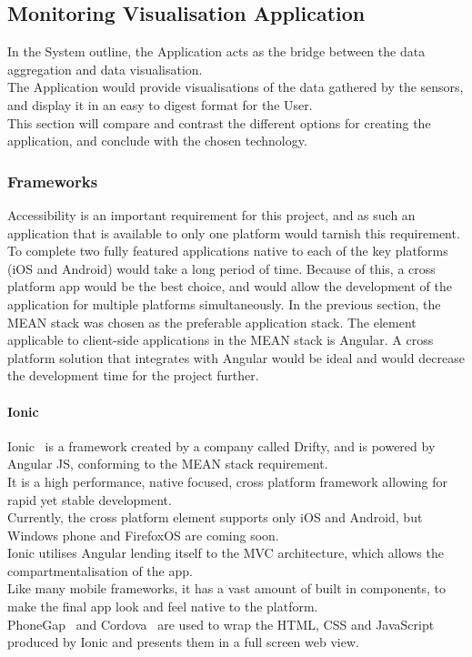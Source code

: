\documentclass[draft,preprint,12pt,3p]{elsarticle}
\begin{document}
\clearpage
\subsection{Monitoring Visualisation Application}
In the System outline, the Application acts as the bridge between the data aggregation and data visualisation.\\
The Application would provide visualisations of the data gathered by the sensors, and display it in an easy to digest format for the User.\\
This section will compare and contrast the different options for creating the application, and conclude with the chosen technology.

\subsubsection{Frameworks}
Accessibility is an important requirement for this project, and as such an application that is available to only one platform would tarnish this requirement.\\
To complete two fully featured applications native to each of the key platforms (iOS and Android) would take a long period of time. Because of this, a cross platform app would be the best choice, and would allow the development of the application for multiple platforms simultaneously.
In the previous section, the MEAN stack was chosen as the preferable application stack. The element applicable to client-side applications in the MEAN stack is Angular. A cross platform solution that integrates with Angular would be ideal and would decrease the development time for the project further.

\paragraph{Ionic}
Ionic~\cite{ionic} is a framework created by a company called Drifty, and is powered by Angular JS, conforming to the MEAN stack requirement.\\
It is a high performance, native focused, cross platform framework allowing for rapid yet stable development.\\
Currently, the cross platform element supports only iOS and Android, but Windows phone and FirefoxOS are coming soon.\\
Ionic utilises Angular lending itself to the MVC architecture, which allows the compartmentalisation of the app.\\
Like many mobile frameworks, it has a vast amount of built in components, to make the final app look and feel native to the platform.\\ PhoneGap~\cite{phonegap} and Cordova~\cite{Cordova} are used to wrap the HTML, CSS and JavaScript produced by Ionic and presents them in a full screen web view.
\end{document}
